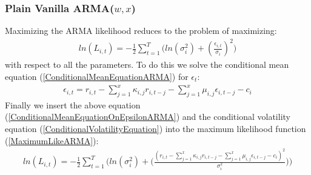 \subsubsection{Plain Vanilla ARMA($w,x$)}
Maximizing the ARMA likelihood reduces to the problem of maximizing:
\begin{align} 
    ln(L_{i,t})=-\frac{1}{2}\sum_{t=1}^T\bigg( ln(\sigma_{i}^2)+(\frac{\epsilon_{i,t}}{\sigma_i})^2\bigg)  \label{MaximumLikeARMA}
\end{align}
with respect to all the parameters. To do this we solve the conditional mean equation (\ref{ConditionalMeanEquationARMA}) for $\epsilon_t$:
\begin{align}
     \epsilon_{i,t}=r_{i,t}-\sum_{j=1}^x\kappa_{i,j} r_{i,t-j}-\sum_{j=1}^x\mu_{i,j} \epsilon_{i,t-j}-c_i \label{ConditionalMeanEquationOnEpsilon}
\end{align}
Finally we insert the above equation (\ref{ConditionalMeanEquationOnEpsilonARMA}) and the conditional volatility equation (\ref{ConditionalVolatilityEquation}) into the maximum likelihood function (\ref{MaximumLikeARMA}):
\begin{align} 
    ln(L_{i,t})=-\frac{1}{2}\sum_{t=1}^T\Bigg( ln(\sigma_i^2)+\Big(\frac{(r_{i,t}-\sum_{j=1}^x\kappa_{i,j} r_{i,t-j}-\sum_{j=1}^x\mu_{i,j} \epsilon_{i,t-j}-c_i)^2}{\sigma_i^2}\Big)\Bigg)  \label{fullMaximumLikeARMA}
\end{align}


